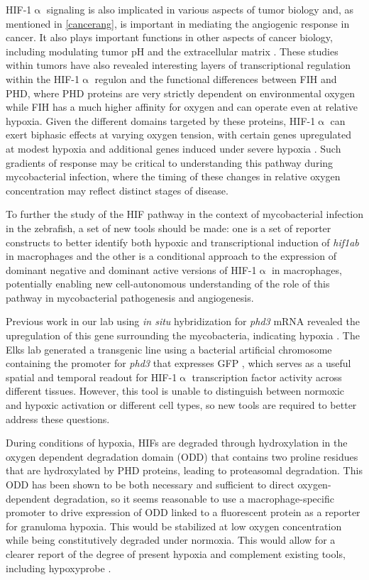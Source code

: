 HIF\hyp{}1$\upalpha$ signaling is also implicated in various aspects of tumor biology and, as mentioned in \autoref{cancerang}, is important in mediating the angiogenic response in cancer. It also plays important functions in other aspects of cancer biology, including modulating tumor pH and the extracellular matrix \citep{Dayan2008}. These studies within tumors have also revealed interesting layers of transcriptional regulation within the HIF\hyp{}1$\upalpha$ regulon and the functional differences between FIH and PHD, where PHD proteins are very strictly dependent on environmental oxygen while FIH has a much higher affinity for oxygen and can operate even at relative hypoxia. Given the different domains targeted by these proteins, HIF\hyp{}1$\upalpha$ can exert biphasic effects at varying oxygen tension, with certain genes upregulated at modest hypoxia and additional genes induced under severe hypoxia \citep{Dayan2008}. Such gradients of response may be critical to understanding this pathway during mycobacterial infection, where the timing of these changes in relative oxygen concentration may reflect distinct stages of disease.

To further the study of the HIF pathway in the context of mycobacterial infection in the zebrafish, a set of new tools should be made: one is a set of reporter constructs to better identify both hypoxic and transcriptional induction of \textit{hif1ab} in macrophages and the other is a conditional approach to the expression of dominant negative and dominant active versions of HIF\hyp{}1$\upalpha$ in macrophages, potentially enabling new cell\hyp{}autonomous understanding of the role of this pathway in mycobacterial pathogenesis and angiogenesis.

Previous work in our lab using \textit{in situ} hybridization for \textit{phd3} mRNA revealed the upregulation of this gene surrounding the mycobacteria, indicating hypoxia \citep{Oehlers2015}. The Elks lab generated a transgenic line using a bacterial artificial chromosome containing the promoter for \textit{phd3} that expresses GFP \citep{Santhakumar2012}, which serves as a useful spatial and temporal readout for HIF\hyp{}1$\upalpha$ transcription factor activity across different tissues. However, this tool is unable to distinguish between normoxic and hypoxic activation or different cell types, so new tools are required to better address these questions.

During conditions of hypoxia, HIFs are degraded through hydroxylation in the oxygen dependent degradation domain (ODD) that contains two proline residues that are hydroxylated by PHD proteins, leading to proteasomal degradation. This ODD has been shown to be both necessary and sufficient to direct oxygen\hyp{}dependent degradation, so it seems reasonable to use a macrophage\hyp{}specific promoter to drive expression of ODD linked to a fluorescent protein as a reporter for granuloma hypoxia. This would be stabilized at low oxygen concentration while being constitutively degraded under normoxia. This would allow for a clearer report of the degree of present hypoxia and complement existing tools, including hypoxyprobe \citep{Cousins2016, Huang1998}.


